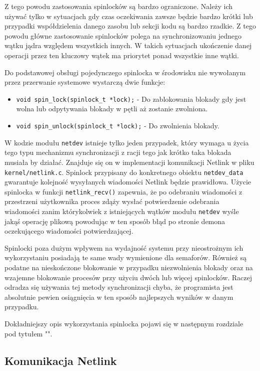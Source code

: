 \documentclass[10pt]{scrartcl}
\begin{document}
Z tego powodu zastosowania spinlocków są bardzo ograniczone. Należy ich używać tylko w sytuacjach gdy czas oczekiwania zawsze będzie bardzo krótki lub przypadki współdzielenia danego zasobu lub sekcji kodu są bardzo rzadkie. Z tego powodu główne zastosowanie spinlocków polega na synchronizowaniu jednego wątku jądra względem wszystkich innych. W takich sytuacjach ukończenie danej operacji przez ten kluczowy wątek ma priorytet ponad wszystkie inne wątki.

Do podstawowej obsługi pojedynczego spinlocka w środowisku nie wywołanym przez przerwanie systemowe wystarczą dwie funkcje:

\begin{itemize}
\itemsep1pt\parskip0pt
\item
  \texttt{void spin\_lock(spinlock\_t *lock);} - Do zablokowania blokady gdy jest wolna lub odpytywania blokady w pętli aż zostanie zwolniona.
\item
  \texttt{void spin\_unlock(spinlock\_t *lock);} - Do zwolnienia blokady.
\end{itemize}

W kodzie modułu \texttt{netdev} istnieje tylko jeden przypadek, który wymaga u życia tego typu mechanizmu synchronizacji z racji tego jak krótko taka blokada musiała by działać. Znajduje się on w implementacji komunikacji Netlink w pliku \texttt{kernel/netlink.c}. Spinlock przypisany do konkretnego obiektu \texttt{netdev\_data} gwarantuje kolejność wysyłanych wiadomości Netlink będzie prawidłowa. Użycie spinlocka w funkcji \texttt{netlink\_recv()} zapewnia, że po odebraniu wiadomości z przestrzeni użytkownika proces zdąży wysłać potwierdzenie odebrania wiadomości zanim którykolwiek z istniejących wątków modułu \texttt{netdev} wyśle jakąś operację plikową powodując w ten sposób błąd po stronie demona oczekującego wiadomości potwierdzającej.

Spinlocki poza dużym wpływem na wydajność systemu przy nieostrożnym ich wykorzystaniu posiadają te same wady wymienione dla semaforów. Również są podatne na nieskończone blokowanie w przypadku niezwolnienia blokady oraz na wzajemne blokowanie procesów przy użyciu dwóch lub więcej spinlocków. Raczej odradza się używania tej metody synchronizacji chyba, że programista jest absolutnie pewien osiągnięcia w ten sposób najlepszych wyników w danym przypadku.

Dokładniejszy opis wykorzystania spinlocka pojawi się w następnym rozdziale pod tytułem "".

\subsection{Komunikacja Netlink}
\label{netlinkcomm}
\end{document}
